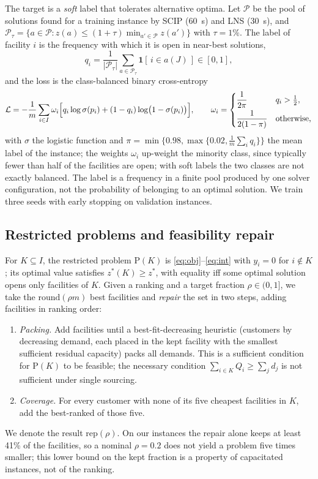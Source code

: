 The target is a \emph{soft} label that tolerates alternative optima. Let $\mathcal{P}$ be the
pool of solutions found for a training instance by SCIP (60~s) and LNS (30~s), and
$\mathcal{P}_{\tau}=\{a\in\mathcal{P}: z(a)\le(1+\tau)\min_{a'\in\mathcal{P}}z(a')\}$ with
$\tau=1\%$. The label of facility $i$ is the frequency with which it is open in near-best
solutions,
\begin{equation}\label{eq:label}
q_i=\frac{1}{|\mathcal{P}_{\tau}|}\sum_{a\in\mathcal{P}_{\tau}}\mathbf{1}[\,i\in a(J)\,]\in[0,1],
\end{equation}
and the loss is the class-balanced binary cross-entropy
\begin{equation}\label{eq:loss}
\mathcal{L}=-\frac{1}{m}\sum_{i\in I}\omega_i\Bigl[q_i\log\sigma(p_i)+(1-q_i)\log\bigl(1-\sigma(p_i)\bigr)\Bigr],
\qquad
\omega_i=\begin{cases}\dfrac{1}{2\pi} & q_i>\tfrac12,\\[2mm] \dfrac{1}{2(1-\pi)} & \text{otherwise,}\end{cases}
\end{equation}
with $\sigma$ the logistic function and $\pi=\min\{0.98,\max\{0.02,\frac1m\sum_i q_i\}\}$ the
mean label of the instance; the weights $\omega_i$ up-weight the minority class, since typically fewer than half of the
facilities are open; with soft labels the two classes are not exactly balanced. The label is a
frequency in a finite pool produced by one solver configuration, not the probability of belonging
to an optimal solution. We train three seeds with
early stopping on validation instances.

\subsection{Restricted problems and feasibility repair}\label{sec:repair}
For $K\subseteq I$, the restricted problem $\mathrm{P}(K)$ is \eqref{eq:obj}--\eqref{eq:int} with
$y_i=0$ for $i\notin K$; its optimal value satisfies $z^\ast(K)\ge z^\ast$, with equality iff
some optimal solution opens only facilities of $K$. Given a ranking and a target fraction
$\rho\in(0,1]$, we take the $\mathrm{round}(\rho m)$ best facilities and \emph{repair} the set in two
steps, adding facilities in ranking order:
\begin{enumerate}
\item \emph{Packing.} Add facilities until a best-fit-decreasing heuristic (customers by
decreasing demand, each placed in the kept facility with the smallest sufficient residual
capacity) packs all demands. This is a sufficient condition for $\mathrm{P}(K)$ to be feasible; the necessary
condition $\sum_{i\in K}Q_i\ge\sum_j d_j$ is not sufficient under single sourcing.
\item \emph{Coverage.} For every customer with none of its five cheapest facilities in $K$, add
the best-ranked of those five.
\end{enumerate}
We denote the result $\mathrm{rep}(\rho)$. On our instances the repair alone keeps at least 41\%
of the facilities, so a nominal $\rho=0.2$ does not yield a problem five times smaller; this
lower bound on the kept fraction is a property of capacitated instances, not of the ranking.

